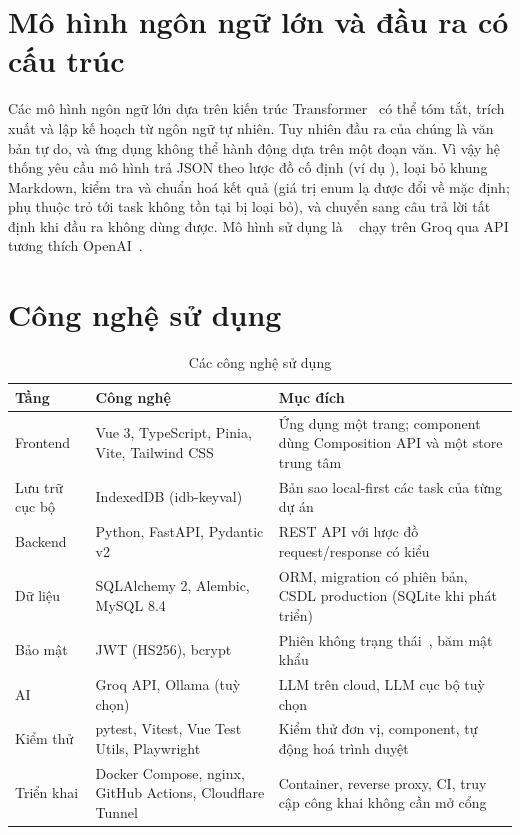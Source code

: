 \documentclass[../main.tex]{subfiles}
\begin{document}
\section{Mô hình ngôn ngữ lớn và đầu ra có cấu trúc}
Các mô hình ngôn ngữ lớn dựa trên kiến trúc Transformer~\cite{vaswani2017attention} có thể tóm tắt,
trích xuất và lập kế hoạch từ ngôn ngữ tự nhiên. Tuy nhiên đầu ra của chúng là văn bản tự do, và ứng
dụng không thể hành động dựa trên một đoạn văn. Vì vậy hệ thống yêu cầu mô hình trả JSON theo lược đồ cố
định (ví dụ ), loại bỏ khung Markdown, kiểm tra và
chuẩn hoá kết quả (giá trị enum lạ được đổi về mặc định; phụ thuộc trỏ tới task không tồn tại bị
loại bỏ), và chuyển sang câu trả lời tất định khi đầu ra không dùng được. Mô hình sử dụng là
~\cite{openai2025gptoss} chạy trên Groq qua API tương thích
OpenAI~\cite{groqdocs}.

\section{Công nghệ sử dụng}
\begin{table}[H]
\centering
\caption{Các công nghệ sử dụng}\label{tab:stack}
\renewcommand{\arraystretch}{1.25}
\begin{tabular}{|p{3.0cm}|p{4.2cm}|p{6.5cm}|}
\hline
\textbf{Tầng} & \textbf{Công nghệ} & \textbf{Mục đích} \\ \hline
Frontend & Vue 3, TypeScript, Pinia, Vite, Tailwind CSS & Ứng dụng một trang; component dùng Composition API và một store trung tâm~\cite{vuejs} \\ \hline
Lưu trữ cục bộ & IndexedDB (idb-keyval) & Bản sao local-first các task của từng dự án \\ \hline
Backend & Python, FastAPI, Pydantic v2 & REST API với lược đồ request/response có kiểu~\cite{fastapi} \\ \hline
Dữ liệu & SQLAlchemy 2, Alembic, MySQL 8.4 & ORM, migration có phiên bản, CSDL production (SQLite khi phát triển) \\ \hline
Bảo mật & JWT (HS256), bcrypt & Phiên không trạng thái~\cite{rfc7519jwt}, băm mật khẩu \\ \hline
AI & Groq API, Ollama (tuỳ chọn) & LLM trên cloud, LLM cục bộ tuỳ chọn \\ \hline
Kiểm thử & pytest, Vitest, Vue Test Utils, Playwright & Kiểm thử đơn vị, component, tự động hoá trình duyệt \\ \hline
Triển khai & Docker Compose, nginx, GitHub Actions, Cloudflare Tunnel & Container, reverse proxy, CI, truy cập công khai không cần mở cổng~\cite{cloudflaretunnel} \\ \hline
\end{tabular}
\end{table}
\end{document}

